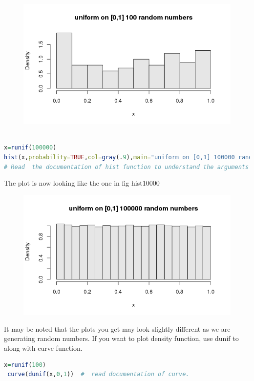 \documentclass["../Applied_probabillity _and_statistics_lab_KTU.tex"]{subfiles}
\begin{document}
\begin{figure}
\centering
\includegraphics[scale=.4]{chapters/images/hist_100}
\end{figure}

  \begin{lstlisting}[language=R]
  
x=runif(100000)  
hist(x,probability=TRUE,col=gray(.9),main="uniform on [0,1] 100000 random numbers"
# Read  the documentation of hist function to understand the arguments 

\end{lstlisting}

The plot is now looking like the one in fig  hist10000

\begin{figure}
\centering
\includegraphics[scale=.4]{chapters/images/hist_10000}
\end{figure}

It may be noted that the plots you get  may look slightly different as we are generating random numbers.
If  you want to plot density function, use dunif to  along with curve function.
 \begin{lstlisting}[language=R]
x=runif(100)  
 curve(dunif(x,0,1))  #  read documentation of curve. 
\end{lstlisting}
\end{document}
